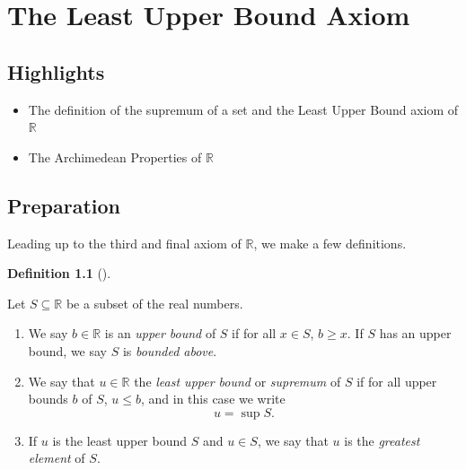 \documentclass[
  letterpaper,
  DIV=11,
  numbers=noendperiod]{scrreprt}
\providecommand{\tightlist}{%
  \setlength{\itemsep}{0pt}\setlength{\parskip}{0pt}}
\def\R{\mathbb R}
\theoremstyle{plain}
\theoremstyle{definition}
\theoremstyle{plain}
\theoremstyle{plain}
\theoremstyle{definition}
\theoremstyle{definition}
\newtheorem{definition}{Definition}[chapter]
\theoremstyle{remark}
\begin{document}
\chapter{The Least Upper Bound Axiom}\label{the-least-upper-bound-axiom}

\section{Highlights}\label{highlights-1}

\begin{itemize}
\tightlist
\item
  The definition of the supremum of a set and the Least Upper Bound
  axiom of \(\R\)
\item
  The Archimedean Properties of \(\R\)
\end{itemize}

\section{Preparation}\label{preparation-1}

Leading up to the third and final axiom of \(\R\), we make a few
definitions.

\begin{definition}[]\protect\hypertarget{def-lub}{}\label{def-lub}

Let \(S\subseteq\R\) be a subset of the real numbers.

\begin{enumerate}
\def\labelenumi{\arabic{enumi}.}
\tightlist
\item
  We say \(b\in\R\) is an \emph{upper bound} of \(S\) if for all
  \(x\in S\), \(b\geq x.\) If \(S\) has an upper bound, we say \(S\) is
  \emph{bounded above}.
\item
  We say that \(u\in\R\) the \emph{least upper bound} or \emph{supremum}
  of \(S\) if for all upper bounds \(b\) of \(S\), \(u\leq b\), and in
  this case we write \[u=\sup S.\]
\item
  If \(u\) is the least upper bound \(S\) and \(u\in S\), we say that
  \(u\) is the \emph{greatest element} of \(S.\)
\end{enumerate}

\end{definition}
\end{document}
